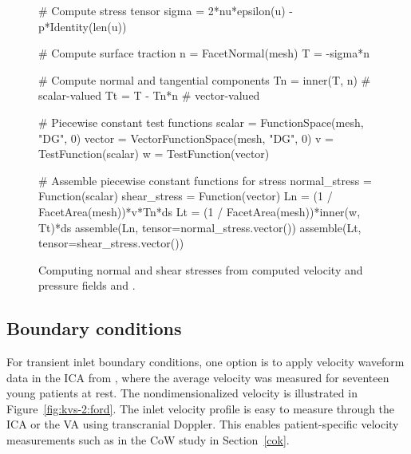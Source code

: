 
\begin{figure}
\begin{python}
# Compute stress tensor
sigma = 2*nu*epsilon(u) - p*Identity(len(u))

# Compute surface traction
n = FacetNormal(mesh)
T = -sigma*n

# Compute normal and tangential components
Tn = inner(T, n) # scalar-valued
Tt = T - Tn*n    # vector-valued

# Piecewise constant test functions
scalar = FunctionSpace(mesh, "DG", 0)
vector = VectorFunctionSpace(mesh, "DG", 0)
v = TestFunction(scalar)
w = TestFunction(vector)

# Assemble piecewise constant functions for stress
normal_stress = Function(scalar)
shear_stress = Function(vector)
Ln = (1 / FacetArea(mesh))*v*Tn*ds
Lt = (1 / FacetArea(mesh))*inner(w, Tt)*ds
assemble(Ln, tensor=normal_stress.vector())
assemble(Lt, tensor=shear_stress.vector())
\end{python}
  \caption{Computing normal and shear stresses from computed
    velocity and pressure fields  and .}
\label{fig:kvs-2:stress_code}\end{figure}

\subsection{Boundary conditions} \label{resistance_bcs}

For transient inlet boundary conditions, one option is to apply
velocity waveform data in the ICA from \citet{FordAlperinLeeEtAl2005},
where the average velocity was measured for seventeen young patients
at rest. The nondimensionalized velocity is illustrated in
Figure~\ref{fig:kvs-2:ford}. The inlet velocity profile is easy to
measure through the ICA or the VA using transcranial Doppler. This
enables patient-specific velocity measurements such as in the CoW
study in Section~\ref{cok}.

